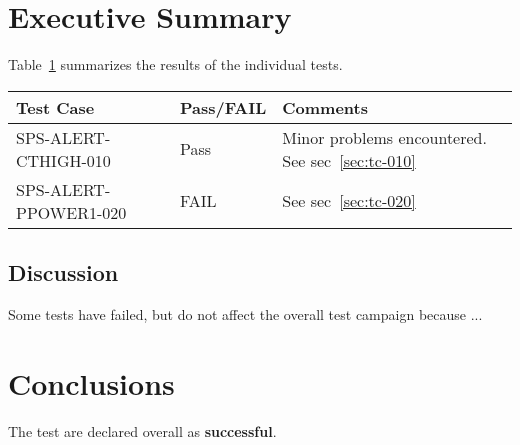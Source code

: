 \section{Executive Summary}

Table~\ref{tab:summary-table} summarizes the results of the individual tests.

\begin{table}[H]
    \begin{tabular}{|p{5cm}|l| p{7cm} | }
    \hline
    {\bf Test Case} & {\bf Pass/FAIL} & {\bf Comments} \\ \hline
    SPS-ALERT-CTHIGH-010 & Pass & Minor problems encountered. See sec~\ref{sec:tc-010} \\ \hline
    SPS-ALERT-PPOWER1-020 & FAIL & See sec~\ref{sec:tc-020} \\ \hline
    \end{tabular}
\label{tab:summary-table}
\end{table}

\subsection{Discussion}
Some tests have failed, but do not affect the overall test campaign because ...

\section{Conclusions}

The test are declared overall as {\bf successful}.